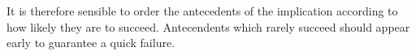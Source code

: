 It is therefore sensible to order the antecedents of the implication according to how likely they are to succeed. Antecendents which rarely succeed should appear early to guarantee a quick failure.








